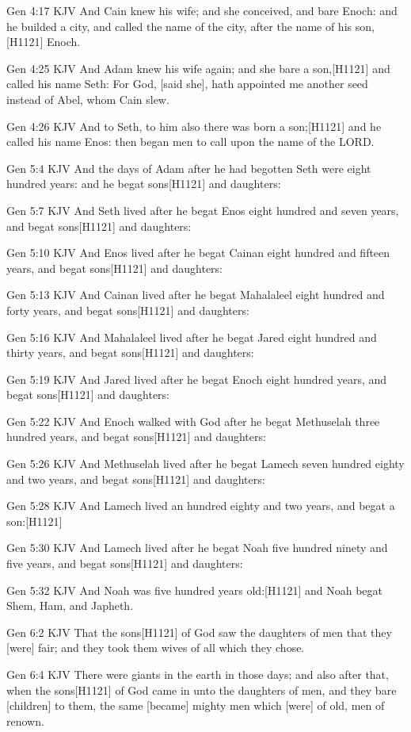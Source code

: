 \documentclass{book}
\begin{document}
Gen 4:17 KJV
And Cain knew his wife; and she conceived, and bare Enoch: and he builded a city, and called the name of the city, after the name of his son,[H1121] Enoch.

Gen 4:25 KJV
And Adam knew his wife again; and she bare a son,[H1121] and called his name Seth: For God, [said she], hath appointed me another seed instead of Abel, whom Cain slew.

Gen 4:26 KJV
And to Seth, to him also there was born a son;[H1121] and he called his name Enos: then began men to call upon the name of the LORD.

Gen 5:4 KJV
And the days of Adam after he had begotten Seth were eight hundred years: and he begat sons[H1121] and daughters:

Gen 5:7 KJV
And Seth lived after he begat Enos eight hundred and seven years, and begat sons[H1121] and daughters:

Gen 5:10 KJV
And Enos lived after he begat Cainan eight hundred and fifteen years, and begat sons[H1121] and daughters:

Gen 5:13 KJV
And Cainan lived after he begat Mahalaleel eight hundred and forty years, and begat sons[H1121] and daughters:

Gen 5:16 KJV
And Mahalaleel lived after he begat Jared eight hundred and thirty years, and begat sons[H1121] and daughters:

Gen 5:19 KJV
And Jared lived after he begat Enoch eight hundred years, and begat sons[H1121] and daughters:

Gen 5:22 KJV
And Enoch walked with God after he begat Methuselah three hundred years, and begat sons[H1121] and daughters:

Gen 5:26 KJV
And Methuselah lived after he begat Lamech seven hundred eighty and two years, and begat sons[H1121] and daughters:

Gen 5:28 KJV
And Lamech lived an hundred eighty and two years, and begat a son:[H1121]

Gen 5:30 KJV
And Lamech lived after he begat Noah five hundred ninety and five years, and begat sons[H1121] and daughters:

Gen 5:32 KJV
And Noah was five hundred years old:[H1121] and Noah begat Shem, Ham, and Japheth.

Gen 6:2 KJV
That the sons[H1121] of God saw the daughters of men that they [were] fair; and they took them wives of all which they chose.

Gen 6:4 KJV
There were giants in the earth in those days; and also after that, when the sons[H1121] of God came in unto the daughters of men, and they bare [children] to them, the same [became] mighty men which [were] of old, men of renown.
\end{document}
